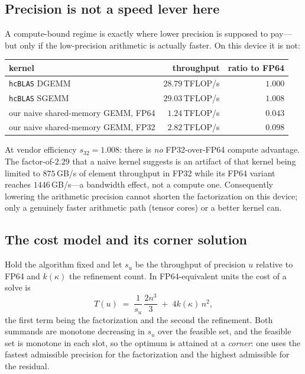 \subsection{Precision is not a speed lever here}

A compute-bound regime is exactly where lower precision is supposed to pay---but
only if the low-precision arithmetic is actually faster. On this device it is
not:
\begin{center}
\small
\begin{tabular}{lrr}
  \toprule
  kernel & throughput & ratio to FP64 \\
  \midrule
  \texttt{hcBLAS} DGEMM & $28.79$\,TFLOP/s & $1.000$ \\
  \texttt{hcBLAS} SGEMM & $29.03$\,TFLOP/s & $1.008$ \\
  our naive shared-memory GEMM, FP64 & $1.24$\,TFLOP/s & $0.043$ \\
  our naive shared-memory GEMM, FP32 & $2.82$\,TFLOP/s & $0.098$ \\
  \bottomrule
\end{tabular}
\end{center}
At vendor efficiency $s_{32}=1.008$: there is \emph{no} FP32-over-FP64 compute
advantage. The factor-of-$2.29$ that a naive kernel suggests is an artifact of
that kernel being limited to $875$\,GB/s of element throughput in FP32 while its
FP64 variant reaches $1446$\,GB/s---a bandwidth effect, not a compute one.
Consequently lowering the arithmetic precision cannot shorten the factorization
on this device; only a genuinely faster arithmetic path (tensor cores) or a
better kernel can.

\subsection{The cost model and its corner solution}\label{sec:cost}

Hold the algorithm fixed and let $s_u$ be the throughput of precision $u$
relative to FP64 and $k(\kappa)$ the refinement count. In FP64-equivalent units
the cost of a solve is
\begin{equation}\label{eq:cost}
  T(u) \;=\; \frac{1}{s_u}\,\frac{2n^{3}}{3} \;+\; 4k(\kappa)\,n^{2},
\end{equation}
the first term being the factorization and the second the refinement. Both
summands are monotone decreasing in $s_u$ over the feasible set, and the feasible
set is monotone in each slot, so the optimum is attained at a \emph{corner}: one
uses the fastest admissible precision for the factorization and the highest
admissible for the residual.

